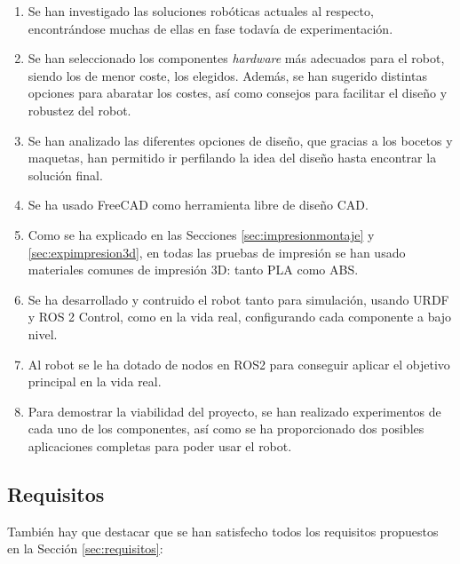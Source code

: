 \begin{enumerate}
	\item Se han investigado las soluciones robóticas actuales al respecto, encontrándose muchas de ellas en fase todavía de experimentación.
	\item Se han seleccionado los componentes \textit{hardware} más adecuados para el robot, siendo  los de menor coste, los elegidos. Además, se han sugerido distintas opciones para abaratar los costes, así como consejos para facilitar el diseño y robustez del robot. 
	\item Se han analizado las diferentes opciones de diseño, que gracias a los bocetos y maquetas, han permitido ir perfilando la idea del diseño hasta encontrar la solución final.
	\item Se ha usado FreeCAD como herramienta libre de diseño \acs{CAD}.
	\item Como se ha explicado en las Secciones \ref{sec:impresionmontaje} y \ref{sec:expimpresion3d}, en todas las pruebas de impresión se han usado materiales comunes de impresión 3D: tanto PLA como ABS.
	\item Se ha desarrollado  y contruido el robot tanto para simulación, usando URDF y ROS 2 Control, como en la vida real, configurando cada componente a bajo nivel.
	\item Al robot se le ha dotado de nodos en ROS2 para conseguir aplicar el objetivo principal en la vida real.
	\item Para demostrar la viabilidad del proyecto, se han realizado experimentos de cada uno de los componentes, así como se ha proporcionado dos posibles aplicaciones completas para poder usar el robot.  
\end{enumerate}

\subsection{Requisitos}

También hay que destacar que se han satisfecho todos los requisitos propuestos en la Sección \ref{sec:requisitos}:

